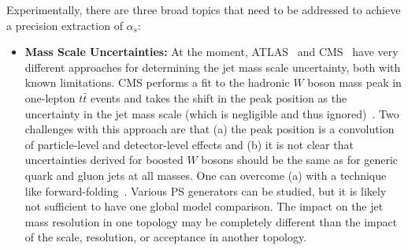 \documentclass[11pt]{cernrep}
\begin{document}
Experimentally, there are three broad topics that need to be addressed to achieve a precision extraction of $\alpha_s$:
%
\begin{itemize}
%
\item {\bf Mass Scale Uncertainties:} At the moment, ATLAS~\cite{Aaboud:2017qwh} and CMS~\cite{CMS-PAS-SMP-16-010} have very different approaches for determining the jet mass scale uncertainty, both with known limitations.
%
CMS performs a fit to the hadronic $W$ boson mass peak in one-lepton $t\bar{t}$ events and takes the shift in the peak position as the uncertainty in the jet mass scale (which is negligible and thus ignored)~\cite{Sirunyan:2016cao}.
%
Two challenges with this approach are that (a) the peak position is a convolution of particle-level and detector-level effects and (b) it is not clear that uncertainties derived for boosted $W$ bosons should be the same as for generic quark and gluon jets at all masses.
%
One can overcome (a) with a technique like forward-folding~\cite{ATLAS-CONF-2016-008,ATLAS-CONF-2016-035}.
%
Various PS generators can be studied, but it is likely not sufficient to have one global model comparison.
%
The impact on the jet mass resolution in one topology may be completely different than the impact of the scale, resolution, or acceptance in another topology.


\end{itemize}
\end{document}
